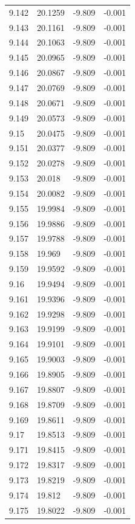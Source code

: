 \begin{tabular}{llll}
9.142 & 20.1259 & -9.809 & -0.001 \\
9.143 & 20.1161 & -9.809 & -0.001 \\
9.144 & 20.1063 & -9.809 & -0.001 \\
9.145 & 20.0965 & -9.809 & -0.001 \\
9.146 & 20.0867 & -9.809 & -0.001 \\
9.147 & 20.0769 & -9.809 & -0.001 \\
9.148 & 20.0671 & -9.809 & -0.001 \\
9.149 & 20.0573 & -9.809 & -0.001 \\
9.15 & 20.0475 & -9.809 & -0.001 \\
9.151 & 20.0377 & -9.809 & -0.001 \\
9.152 & 20.0278 & -9.809 & -0.001 \\
9.153 & 20.018 & -9.809 & -0.001 \\
9.154 & 20.0082 & -9.809 & -0.001 \\
9.155 & 19.9984 & -9.809 & -0.001 \\
9.156 & 19.9886 & -9.809 & -0.001 \\
9.157 & 19.9788 & -9.809 & -0.001 \\
9.158 & 19.969 & -9.809 & -0.001 \\
9.159 & 19.9592 & -9.809 & -0.001 \\
9.16 & 19.9494 & -9.809 & -0.001 \\
9.161 & 19.9396 & -9.809 & -0.001 \\
9.162 & 19.9298 & -9.809 & -0.001 \\
9.163 & 19.9199 & -9.809 & -0.001 \\
9.164 & 19.9101 & -9.809 & -0.001 \\
9.165 & 19.9003 & -9.809 & -0.001 \\
9.166 & 19.8905 & -9.809 & -0.001 \\
9.167 & 19.8807 & -9.809 & -0.001 \\
9.168 & 19.8709 & -9.809 & -0.001 \\
9.169 & 19.8611 & -9.809 & -0.001 \\
9.17 & 19.8513 & -9.809 & -0.001 \\
9.171 & 19.8415 & -9.809 & -0.001 \\
9.172 & 19.8317 & -9.809 & -0.001 \\
9.173 & 19.8219 & -9.809 & -0.001 \\
9.174 & 19.812 & -9.809 & -0.001 \\
9.175 & 19.8022 & -9.809 & -0.001 \\

\end{tabular}
